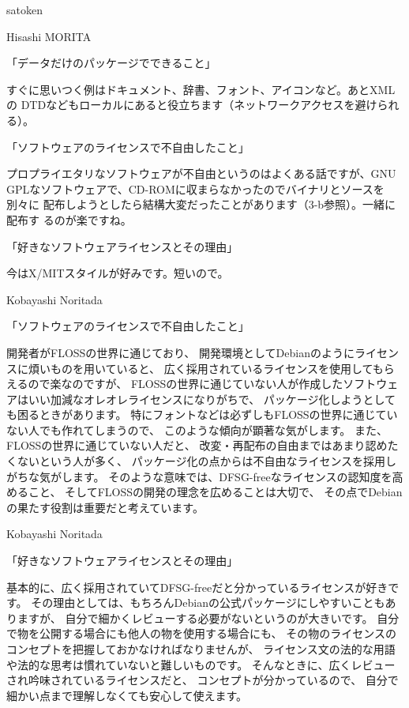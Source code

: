 \documentclass[cjk,dvipdfmx,12pt]{beamer}
\begin{document}
\begin{frame}{satoken}
\end{frame}\begin{frame}{Hisashi MORITA}

「データだけのパッケージでできること」

すぐに思いつく例はドキュメント、辞書、フォント、アイコンなど。あとXMLの
DTDなどもローカルにあると役立ちます（ネットワークアクセスを避けられる）。

「ソフトウェアのライセンスで不自由したこと」

プロプライエタリなソフトウェアが不自由というのはよくある話ですが、GNU
GPLなソフトウェアで、CD-ROMに収まらなかったのでバイナリとソースを別々に
配布しようとしたら結構大変だったことがあります（3-b参照）。一緒に配布す
るのが楽ですね。

「好きなソフトウェアライセンスとその理由」

今はX/MITスタイルが好みです。短いので。

\end{frame}\begin{frame}{Kobayashi Noritada}

「ソフトウェアのライセンスで不自由したこと」

開発者がFLOSSの世界に通じており、
開発環境としてDebianのようにライセンスに煩いものを用いていると、
広く採用されているライセンスを使用してもらえるので楽なのですが、
FLOSSの世界に通じていない人が作成したソフトウェアはいい加減なオレオレライセンスになりがちで、
パッケージ化しようとしても困るときがあります。
特にフォントなどは必ずしもFLOSSの世界に通じていない人でも作れてしまうので、
このような傾向が顕著な気がします。
また、FLOSSの世界に通じていない人だと、
改変・再配布の自由まではあまり認めたくないという人が多く、
パッケージ化の点からは不自由なライセンスを採用しがちな気がします。
そのような意味では、DFSG-freeなライセンスの認知度を高めること、
そしてFLOSSの開発の理念を広めることは大切で、
その点でDebianの果たす役割は重要だと考えています。

\end{frame}\begin{frame}{Kobayashi Noritada}

「好きなソフトウェアライセンスとその理由」

基本的に、広く採用されていてDFSG-freeだと分かっているライセンスが好きです。
その理由としては、もちろんDebianの公式パッケージにしやすいこともありますが、
自分で細かくレビューする必要がないというのが大きいです。
自分で物を公開する場合にも他人の物を使用する場合にも、
その物のライセンスのコンセプトを把握しておかなければなりませんが、
ライセンス文の法的な用語や法的な思考は慣れていないと難しいものです。
そんなときに、広くレビューされ吟味されているライセンスだと、
コンセプトが分かっているので、
自分で細かい点まで理解しなくても安心して使えます。



\end{frame}
\end{document}
